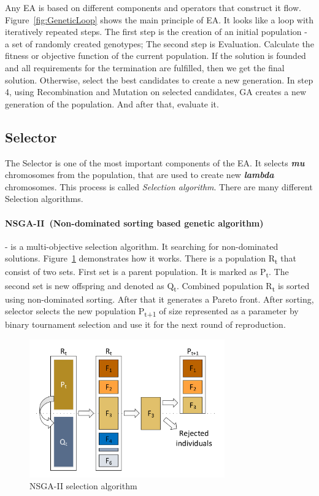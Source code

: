 Any EA is based on different components and operators that construct it flow.
Figure~\ref{fig:GeneticLoop} shows the main principle of EA. It looks like a loop with iteratively repeated steps.
The first step is the creation of an initial population - a set of randomly created genotypes;
The second step is Evaluation. Calculate the fitness or objective function of the current population.
If the solution is founded and all requirements for the termination are fulfilled, then we get the final solution. Otherwise, select the best candidates to create a new generation.
In step 4, using Recombination and Mutation on selected candidates, GA creates a new generation of the population. And after that, evaluate it.

\subsection{Selector}\label{sec:GeneticAlgorithm:Selector}

The Selector is one of the most important components of the EA. It selects \textit{\textbf{mu}} chromosomes from the population, that are used to create new \textit{\textbf{lambda}} chromosomes. This process is called \textit{Selection algorithm}. There are many different Selection algorithms.


\paragraph{NSGA-II~(Non-dominated sorting based genetic algorithm)~\cite{deb2000}} - is a multi-objective selection algorithm. It searching for non-dominated solutions. Figure~\ref{fig:nsga2} demonstrates how it works. There is a population \texorpdfstring{R\textsubscript{t}}{R t} that consist of two sets. First set is a parent population. It is marked as \texorpdfstring{P\textsubscript{t}}{P t}. The second set is new offspring and denoted as \texorpdfstring{Q\textsubscript{t}}{Q t}. Combined population \texorpdfstring{R\textsubscript{t}}{R t} is sorted using non-dominated sorting. After that it generates a Pareto front. After sorting, selector selects the new population \texorpdfstring{P\textsubscript{t+1}}{P t+1} of size represented as a parameter by binary tournament selection and use it for the next round of reproduction.

\begin{figure}
	\centering
	\includegraphics[width=0.75\textwidth]{images/nsga2.pdf}
	\caption[NSGA-II selection algorithm]{NSGA-II selection algorithm}
	\label{fig:nsga2}
\end{figure}

